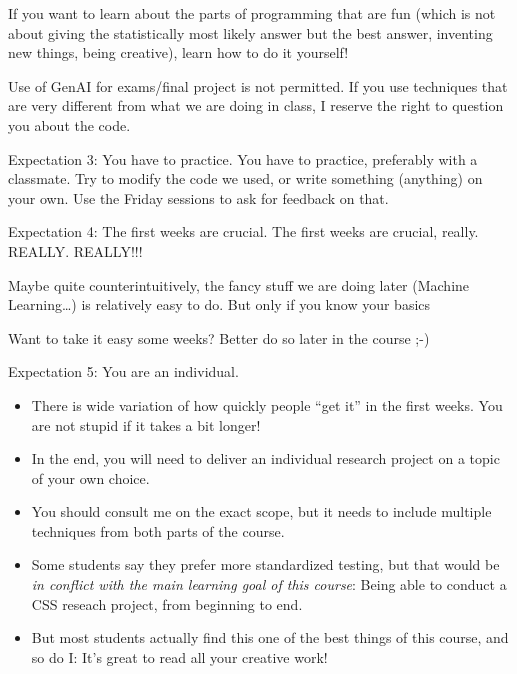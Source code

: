 \documentclass[compress]{beamer}
\begin{document}
\begin{frame}[standout]
	If you want to learn about the parts of programming that are fun (which is not about giving the statistically most likely answer but the best answer, inventing new things, being creative), learn how to do it yourself! 
\end{frame}

\begin{frame}[standout]
	Use of GenAI for exams/final project is not permitted. If you use techniques that are very different from what we are doing in class, I reserve the right to question you about the code. 
\end{frame}


\begin{frame}{Expectation 3: You have to practice.}
	You have to practice, preferably with a classmate. Try to modify the code we used, or write something (anything) on your own. Use the Friday sessions to ask for feedback on that.
\end{frame}




\begin{frame}{Expectation 4: The first weeks are crucial.}
The first weeks are crucial, really. REALLY. REALLY!!!

Maybe quite counterintuitively, the fancy stuff we are doing later (Machine Learning\ldots) is relatively easy to do. But only if you know your basics %

Want to take it easy some weeks? Better do so later in the course ;-)
\end{frame}






\begin{frame}{Expectation 5: You are an individual.}
\begin{itemize}
	\item There is wide variation of how quickly people ``get it'' in the first weeks. You are not stupid if it takes a bit longer!
	\item In the end, you will need to deliver an individual research project on a topic of your own choice.
	\item You should consult me on the exact scope, but it needs to include multiple techniques from both parts of the course.
	\item Some students say they prefer more standardized testing, but that would be \emph{in conflict with the main learning goal of this course}: Being able to conduct a CSS reseach project, from beginning to end.
	\item But most students actually find this one of the best things of this course, and so do I: It's great to read all your creative work!
\end{itemize}

\end{frame}
\end{document}
